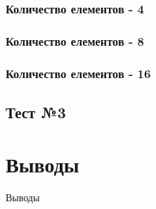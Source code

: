 \documentclass[12pt,a4paper]{article}
\begin{document}
\subsubsection*{Количество елементов - 4}
\subsubsection*{Количество елементов - 8}
\subsubsection*{Количество елементов - 16}




\subsection*{Тест №3}










\raggedright %
\section{Выводы}
    Выводы
\end{document}
